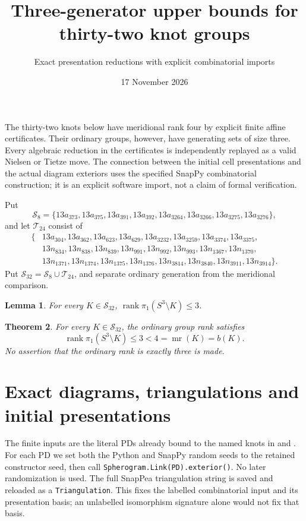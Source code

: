 \documentclass[11pt]{article}
\title{Three-generator upper bounds for thirty-two knot groups}
\author{Exact presentation reductions with explicit combinatorial imports}
\date{17 November 2026}
\newtheorem{theorem}{Theorem}
\newtheorem{lemma}[theorem]{Lemma}
\begin{document}
\maketitle

The thirty-two knots below have meridional rank four by explicit
finite affine certificates. Their ordinary groups,
however, have generating sets of size three. Every algebraic
reduction in the certificates is independently replayed as a valid
Nielsen or Tietze move. The connection between the initial cell
presentations and the actual diagram exteriors uses the specified
SnapPy combinatorial construction; it is an explicit software
import, not a claim of formal verification.

Put
\[
\mathcal S_8=\{13a_{373},13a_{375},13a_{391},13a_{392},
       13a_{3264},13a_{3266},13a_{3275},13a_{3276}\},
\]
and let $\mathcal T_{24}$ consist of
\[
\begin{split}
\{&13a_{304},13a_{362},13a_{623},13a_{629},
13a_{3232},13a_{3259},13a_{3374},13a_{3375},\\
&13n_{834},13n_{838},13n_{839},13n_{991},13n_{992},13n_{993},
13n_{1367},13n_{1370},\\
&13n_{1371},13n_{1374},13n_{1375},13n_{1376},
13n_{3814},13n_{3840},13n_{3911},13n_{3914}\}.
\end{split}
\]
Put $\mathcal S_{32}=\mathcal S_8\cup\mathcal T_{24}$, and separate
ordinary generation from the meridional comparison.

\begin{lemma}\label{lem:upper}
For every $K\in\mathcal S_{32}$,
$\operatorname{rank}\pi_1(S^3\setminus K)\le3$.
\end{lemma}

\begin{theorem}\label{thm:rank}
For every $K\in\mathcal S_{32}$, the ordinary group rank satisfies
\[
 \operatorname{rank}\pi_1(S^3\setminus K)\le3
       <4=\operatorname{mr}(K)=b(K).
\]
No assertion that the ordinary rank is exactly three is made.
\end{theorem}

\section{Exact diagrams, triangulations and initial presentations}

The finite inputs are the literal PDs already bound to the named
knots in  and
. For each PD we set
both the Python and SnapPy random seeds to the retained constructor
seed, then call \texttt{Spherogram.Link(PD).exterior()}.
No later randomization is used. The full SnapPea triangulation string
is saved and reloaded as a \texttt{Triangulation}. This fixes the
labelled combinatorial input and its presentation basis; an unlabelled
isomorphism signature alone would not fix that basis.
\end{document}
